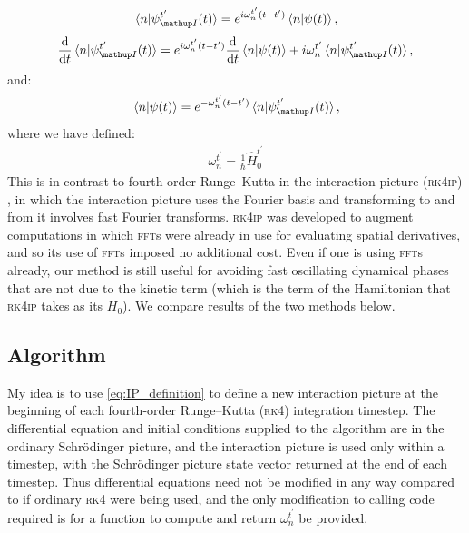 \begin{align}\label{eq:IP_definition_components}
\braket{n}{\psi_\up{I}^{t^\prime}(t)} = e^{ i \omega_n^{t^\prime}(t - t^\prime)}\braket{n}{\psi(t)},
\end{align}
\begin{align}\label{eq:IPDE_components}
\dv t \braket{n}{\psi_\up{I}^{t^\prime}(t)}
    = e^{i \omega_n^{t^\prime}(t - t^\prime)}\dv t \braket{n}{\psi(t)}
      + i\omega_n^{t^\prime}\braket{n}{\psi_\up{I}^{t^\prime}(t)},
\end{align}
and:
\begin{align}\label{eq:backtransform_components}
\braket{n}{\psi(t)} = e^{-\omega_n^{t^\prime}(t - t^\prime)}\braket{n}{\psi_\up{I}^{t^\prime}(t)},
\end{align}
where we have defined:
\begin{align}\label{eq:omega}
\omega_n^{t^\prime} = \frac 1\hbar \hat H_0^{t^\prime}
\end{align}
This is in contrast to fourth order Runge--Kutta in the interaction picture (\textsc{rk4ip}) \cite{caradoc_davies_thesis}, in which the interaction picture uses the Fourier basis and transforming to and from it involves fast Fourier transforms. \textsc{rk4ip} was developed to augment computations in which \textsc{fft}s were already in use for evaluating spatial derivatives, and so its use of \textsc{fft}s imposed no additional cost. Even if one is using \textsc{fft}s already, our method is still useful for avoiding fast oscillating dynamical phases that are not due to the kinetic term (which is the term of the Hamiltonian that \textsc{rk4ip} takes as its $H_0$). We compare results of the two methods below.

\subsection{Algorithm}
My idea is to use \eqref{eq:IP_definition} to define a new interaction picture at the beginning of each fourth-order Runge–Kutta (\textsc{rk4}) integration timestep. The differential equation and initial conditions supplied to the algorithm are in the ordinary Schr\"odinger picture, and the interaction picture is used only within a timestep, with the Schrödinger picture state vector returned at the end of each timestep. Thus differential equations need not be modified in any way compared to if ordinary \textsc{rk4} were being used, and the only modification to calling code required is for a function to compute and return $\omega_n^{t^\prime}$ be provided.

